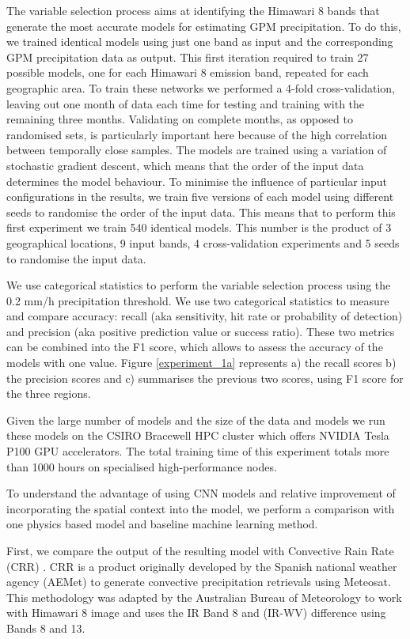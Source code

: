 \documentclass[3p,times]{elsarticle}
\begin{document}
The variable selection process aims at identifying the Himawari 8 bands that generate the most accurate models for estimating GPM precipitation. To do this, we trained identical models using just one band as input and the corresponding GPM precipitation data as output. This first iteration required to train 27 possible models, one for each Himawari 8 emission band, repeated for each geographic area. To train these networks we performed a 4-fold cross-validation, leaving out one month of data each time for testing and training with the remaining three months. Validating on complete months, as opposed to randomised sets, is particularly important here because of the high correlation between temporally close samples. The models are trained using a variation of stochastic gradient descent, which means that the order of the input data determines the model behaviour. To minimise the influence of particular input configurations in the results, we train five versions of each model using different seeds to randomise the order of the input data. This means that to perform this first experiment we train 540 identical models. This number is the product of 3 geographical locations, 9 input bands, 4 cross-validation experiments and 5 seeds to randomise the input data.

We use categorical statistics to perform the variable selection process using the 0.2 mm/h precipitation threshold. We use two categorical statistics to measure and compare accuracy: recall (aka sensitivity, hit rate or probability of detection) and precision (aka positive prediction value or success ratio). These two metrics can be combined into the F1 score, which allows to assess the accuracy of the models with one value. Figure \ref{experiment_1a} represents a) the recall scores b) the precision scores and c) summarises the previous two scores, using F1 score for the three regions.

Given the large number of models and the size of the data and models we run these models on the CSIRO Bracewell HPC cluster which offers NVIDIA Tesla P100 GPU accelerators. The total training time of this experiment totals more than 1000 hours on specialised high-performance nodes.

To understand the advantage of using CNN models and relative improvement of incorporating the spatial context into the model, we perform a comparison with one physics based model and baseline machine learning method.

First, we compare the output of the resulting model with Convective Rain Rate (CRR) \citep{aemetsaf2013}. CRR is a product originally developed by the Spanish national weather agency (AEMet) to generate convective precipitation retrievals using Meteosat. This methodology was adapted by the Australian Bureau of Meteorology to work with Himawari 8 image and uses the IR Band 8 and (IR-WV) difference using Bands 8 and 13.
\end{document}
